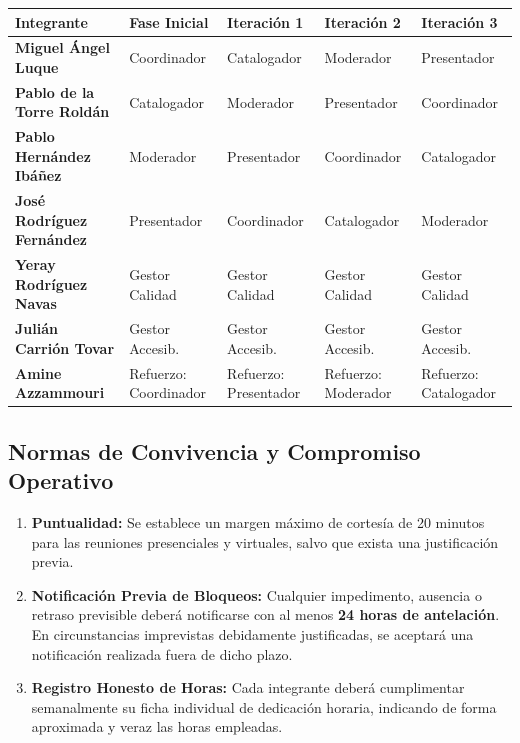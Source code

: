 \vspace{0.2cm}
\noindent
{\small
\begin{tabularx}{\textwidth}{|>{\raggedright\arraybackslash\bfseries}p{4.2cm}|>{\centering\arraybackslash}p{2.3cm}|>{\centering\arraybackslash}X|>{\centering\arraybackslash}X|>{\centering\arraybackslash}X|}
\hline
\rowcolor{tableHeader}
\textbf{Integrante} & \textbf{Fase Inicial} & \textbf{Iteración 1} & \textbf{Iteración 2} & \textbf{Iteración 3} \\
\hline
Miguel Ángel Luque & Coordinador & Catalogador & Moderador & Presentador \\
\hline
Pablo de la Torre Roldán & Catalogador & Moderador & Presentador & Coordinador \\
\hline
Pablo Hernández Ibáñez & Moderador & Presentador & Coordinador & Catalogador \\
\hline
José Rodríguez Fernández & Presentador & Coordinador & Catalogador & Moderador \\
\hline
Yeray Rodríguez Navas & Gestor Calidad & Gestor Calidad & Gestor Calidad & Gestor Calidad \\
\hline
Julián Carrión Tovar & Gestor Accesib. & Gestor Accesib. & Gestor Accesib. & Gestor Accesib. \\
\hline
Amine Azzammouri & Refuerzo: Coordinador & Refuerzo: Presentador & Refuerzo: Moderador & Refuerzo: Catalogador \\
\hline

\end{tabularx}
}
\vspace{0.3cm}

\subsection{Normas de Convivencia y Compromiso Operativo}
\begin{enumerate}[leftmargin=*]
  \item \textbf{Puntualidad:} Se establece un margen máximo de cortesía de 20 minutos para las reuniones presenciales y virtuales, salvo que exista una justificación previa.
  \item \textbf{Notificación Previa de Bloqueos:} Cualquier impedimento, ausencia o retraso previsible deberá notificarse con al menos \textbf{24 horas de antelación}. En circunstancias imprevistas debidamente justificadas, se aceptará una notificación realizada fuera de dicho plazo.
  \item \textbf{Registro Honesto de Horas:} Cada integrante deberá cumplimentar semanalmente su ficha individual de dedicación horaria, indicando de forma aproximada y veraz las horas empleadas.
\end{enumerate}
